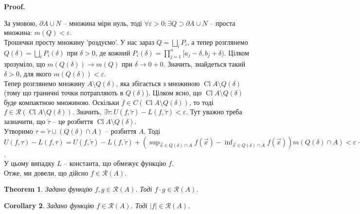 \documentclass[a4paper, 10pt]{article}
\makeatletter
\def\qed{$\blacksquare$}
\theoremstyle{theoremdd}
\newtheorem{theorem}{Theorem}[subsection]
\theoremstyle{theoremdd}
\theoremstyle{theoremdd}
\theoremstyle{theoremdd}
\theoremstyle{theoremdd}
\theoremstyle{theoremdd}
\theoremstyle{theoremdd}
\theoremstyle{theoremdd}
\theoremstyle{theoremdd}
\theoremstyle{theoremdd}
\theoremstyle{theoremdd}
\theoremstyle{theoremdd}
\theoremstyle{theoremdd}
\theoremstyle{theoremdd}
\newtheorem{corollary}[theorem]{Corollary}
\theoremstyle{theoremdd}
\renewenvironment{proof}[1][Proof.\\]{\par
\pushQED{\hfill \qed}%
\normalfont \topsep6\p@\@plus6\p@\relax
\trivlist
\item\relax
{\bfseries
#1\@addpunct{.}}\hspace\labelsep\ignorespaces
}{%
\popQED\endtrivlist\@endpefalse
}
\DeclareMathOperator{\Cl}{Cl}
\makeatother
\begin{document}
\begin{proof}
За умовою, $\partial A \cup N$ -- множина міри нуль, тоді $\forall \varepsilon > 0: \exists Q \supset \partial A \cup N$ -- проста множина: $m(Q) < \varepsilon$.\\
Трошечки просту множину 'роздуємо'. У нас зараз $Q = \displaystyle\bigsqcup_i P_i$, а тепер розглянемо $Q(\delta) = \displaystyle\bigsqcup_i P_i(\delta)$ при $\delta > 0$, де кожний $P_i(\delta) = \displaystyle\prod_{j=1}^n [a_j-\delta,b_j+\delta)$. Цілком зрозуміло, що $m(Q(\delta)) \to m(Q)$ при $\delta \to 0+0$. Значить, знайдеться такий $\delta > 0$, для якого $m(Q(\delta)) < \varepsilon$.\\
Тепер розглянемо множину $A \setminus Q(\delta)$, яка збігається з множиною $\Cl A \setminus Q(\delta)$ (тому що граничні точки потрапляють в $Q(\delta)$). Цілком ясно, що $\Cl A \setminus Q(\delta)$ буде компактною множиною. Оскільки $f \in C(\Cl A \setminus Q(\delta))$, то тоді $f \in \mathcal{R}(\Cl A \setminus Q(\delta))$. Значить, $\exists \tilde{\tau}: U(f,\tilde{\tau}) - L(f,\tilde{\tau}) < \varepsilon$. Тут уважно треба зазначити, що $\tilde{\tau}$ -- це розбиття $\Cl A \setminus Q(\delta)$.\\
Утворимо $\tau = \tilde{\tau} \cup (Q(\delta) \cap A)$ -- розбиття $A$. Тоді\\
$U(f,\tau) - L(f,\tau) = U(f,\tilde{\tau}) - L(f,\tilde{\tau}) + \displaystyle\left( \sup_{\vec{x} \in Q(\delta) \cap A} f(\vec{x}) - \inf_{\vec{x} \in Q(\delta) \cap A} f(\vec{x}) \right) m(Q(\delta) \cap A) < \varepsilon + 2L \varepsilon$.\\
У цьому випадку $L$ -- константа, що обмежує функцію $f$.\\
Отже, ми довели, що дійсно $f \in \mathcal{R}(A)$.
\end{proof}

\begin{theorem}
Задано функцію $f,g \in \mathcal{R}(A)$. Тоді $f \cdot g \in \mathcal{R}(A)$.
\end{theorem}

\begin{corollary}
Задано функцію $f \in \mathcal{R}(A)$. Тоді $|f| \in \mathcal{R}(A)$.
\end{corollary}

\iffalse
\begin{theorem}
Задані множини $A \subset B$. Відомо, що $f \in \mathcal{R}(B)$. Тоді $f \in \mathcal{R}(A)$.\\
\textit{Вказівка: якщо існує $\tau_\varepsilon = \{Q_i\}$, то тоді розглянути $\tau_\varepsilon^A = \{Q_i \cap A\}$.}
\end{theorem}
\fi
\end{document}
